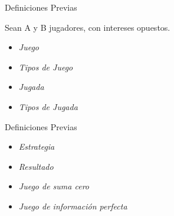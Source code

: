 \documentclass[10pt]{beamer}
\begin{document}
\begin{frame}[fragile]{Definiciones Previas}
	
	Sean A y B jugadores, con intereses opuestos.

 \begin{itemize}
 	\item \textit{Juego}
 	\item\textit{Tipos de Juego}
 	\item\textit{Jugada}
 	\item\textit{Tipos de Jugada}
 	
 	\end{itemize}
 	
  
\end{frame}
\begin{frame}[fragile]{Definiciones Previas}
  
  \begin{itemize}
  \item\textit{Estrategia}
  \item \textit{Resultado}
  \item \textit{Juego de suma cero}
  \item\textit{Juego de información perfecta}


  	\end{itemize}
  
\end{frame}
\end{document}
